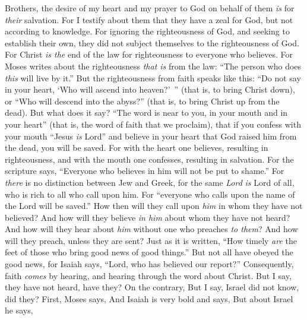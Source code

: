 \begin{biblechapter} %
 Brothers, the desire of my heart and my prayer to God on behalf of them \textit{is} for \textit{their} salvation.
\verse For I testify about them that they have a zeal for God, but not according to knowledge.
\verse For ignoring the righteousness of God, and seeking to establish their own, they did not subject themselves to the righteousness of God.
\verse For Christ \textit{is the} end of the law for righteousness to everyone who believes.
\verse For Moses writes about the righteousness \textit{that is} from the law: “The person who does \textit{this} will live by it.”
\verse But the righteousness from faith speaks like this: “Do not say in your heart, ‘Who will ascend into heaven?’ ” (that is, to bring Christ down),
\verse or “Who will descend into the abyss?” (that is, to bring Christ up from the dead).
\verse But what does it say? “The word is near to you, in your mouth and in your heart” (that is, the word of faith that we proclaim),
\verse that if you confess with your mouth “Jesus \textit{is} Lord” and believe in your heart that God raised him from the dead, you will be saved.
\verse For with the heart one believes, resulting in righteousness, and with the mouth one confesses, resulting in salvation.
\verse For the scripture says, “Everyone who believes in him will not be put to shame.”
\verse For \textit{there} is no distinction between Jew and Greek, for the same \textit{Lord} \textit{is} Lord of all, who is rich to all who call upon him.
\verse For “everyone who calls upon the name of the Lord will be saved.”
\verse How then will they call upon \textit{him} in whom they have not believed? And how will they believe \textit{in him} about whom they have not heard? And how will they hear about \textit{him} without one who preaches \textit{to them}?
\verse And how will they preach, unless they are sent? Just as it is written, “How timely \textit{are} the feet of those who bring good news of good things.”
\verse But not all have obeyed the good news, for Isaiah says, “Lord, who has believed our report?”
\verse Consequently, faith \textit{comes} by hearing, and hearing through the word about Christ.
\verse But I say, they have not heard, have they? On the contrary,
\verse But I say, Israel did not know, did they? First, Moses says,
\verse And Isaiah is very bold and says,
\verse But about Israel he says,
\end{biblechapter}

